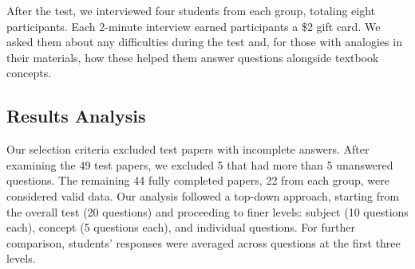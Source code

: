 After the test, we interviewed four students from each group, totaling eight participants.
Each 2-minute interview earned participants a \$2 gift card.
We asked them about any difficulties during the test and, for those with analogies in their materials, how these helped them answer questions alongside textbook concepts.

\subsection{Results Analysis}
\label{sec:study1_results_analysis}
Our selection criteria excluded test papers with incomplete answers. 
After examining the 49 test papers, we excluded 5 that had more than 5 unanswered questions. 
The remaining 44 fully completed papers, 22 from each group, were considered valid data.
Our analysis followed a top-down approach, starting from the overall test (20 questions) and proceeding to finer levels: subject (10 questions each), concept (5 questions each), and individual questions. For further comparison, students' responses were averaged across questions at the first three levels.


